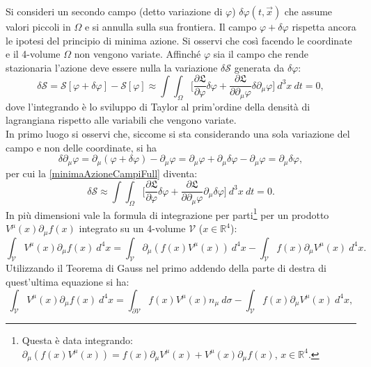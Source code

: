  Si consideri un secondo campo (detto variazione di $\varphi$) $\delta\varphi(t,\vec x)$ che assume valori piccoli in $\Omega$ e si annulla sulla sua frontiera. Il campo $\varphi+\delta\varphi$ rispetta ancora le ipotesi del principio di minima azione. Si osservi che così facendo le coordinate e il 4-volume $\Omega$ non vengono variate. Affinché $\varphi$ sia il campo che rende stazionaria l'azione deve essere nulla la variazione $\delta\mathcal{S}$ generata da $\delta\varphi$:
\begin{equation}
    \delta\mathcal{S}=\mathcal{S}[\varphi+\delta\varphi]-\mathcal{S}[\varphi]\approx\int\int_{\Omega}\bigg[\frac{\partial\mathfrak{L}}{\partial \varphi}\delta\varphi+\frac{\partial\mathfrak{L}}{\partial \partial_\mu\varphi}\delta\partial_\mu\varphi\bigg]\ d^3x\ dt=0,\label{minimaAzioneCampiFull}
\end{equation}
dove l'integrando è lo sviluppo di Taylor al prim'ordine della densità di lagrangiana rispetto alle variabili che vengono variate.\\
In primo luogo si osservi che, siccome si sta considerando una sola variazione del campo e non delle coordinate, si ha
\begin{equation*}
    \delta\partial_\mu\varphi=\partial_\mu(\varphi+\delta\varphi)-\partial_\mu\varphi=\partial_\mu\varphi+\partial_\mu\delta\varphi-\partial_\mu\varphi=\partial_\mu\delta\varphi,
\end{equation*}
per cui la \eqref{minimaAzioneCampiFull} diventa:
\begin{equation}
    \delta\mathcal{S}\approx\int\int_{\Omega}\bigg[\frac{\partial\mathfrak{L}}{\partial \varphi}\delta\varphi+\frac{\partial\mathfrak{L}}{\partial \partial_\mu\varphi}\partial_\mu\delta\varphi\bigg]\ d^3x\ dt=0.\label{minimaAzioneCampiFull'}
\end{equation}
In più dimensioni vale la formula di integrazione per parti\footnote{Questa è data integrando: $\partial_\mu(f(x)V^\mu(x))=f(x)\partial_\mu V^\mu(x)+V^\mu(x)\partial_\mu f(x)$, $x\in \mathbb{R}^4$.} per un prodotto $V^\mu(x)\partial_\mu f(x) $ integrato su un 4-volume $\mathcal{V}$ ($x\in \mathbb{R}^4$):
\begin{equation*}
    \int_{\mathcal{V} }V^\mu(x)\partial_\mu f(x)\ d^4x=\int_{\mathcal{V} }\partial_\mu(f(x)V^\mu(x))\ d^4x-\int_{\mathcal{V} }f(x)\partial_\mu V^\mu(x)\ d^4x.
\end{equation*}
Utilizzando il Teorema di Gauss nel primo addendo della parte di destra di quest'ultima equazione si ha:
\begin{equation*}
\int_{\mathcal{V} }V^\mu(x)\partial_\mu f(x)\ d^4x=\int_{\partial\mathcal{V} }f(x)V^\mu(x)n_\mu\ d\sigma-    \int_{\mathcal{V} }f(x)\partial_\mu V^\mu(x)\ d^4x,
\end{equation*}
